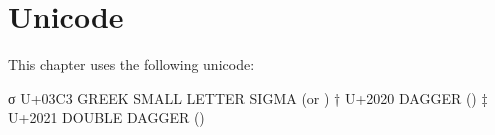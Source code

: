 \hypertarget{unicode}{%
\section{Unicode}\label{unicode}}

This chapter uses the following unicode:

\begin{myDisplay}
σ  U+03C3  GREEK SMALL LETTER SIGMA (\Gs or \sigma)
†  U+2020  DAGGER (\dag)
‡  U+2021  DOUBLE DAGGER (\ddag)
\end{myDisplay}

